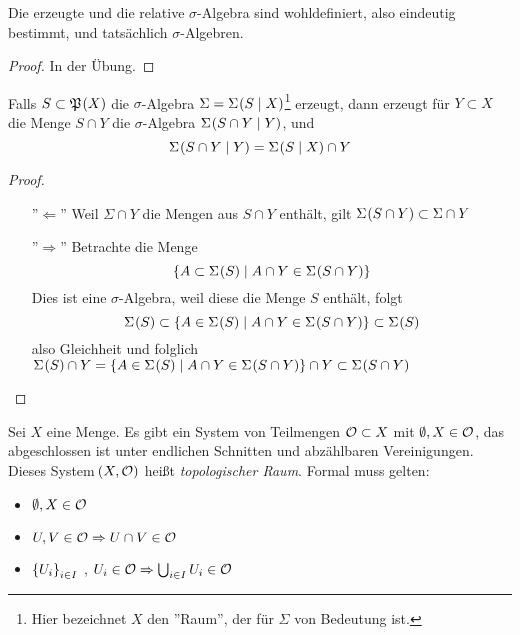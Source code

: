 \documentclass[skript.tex]{subfiles}
\begin{document}
	\begin{lem}
		Die erzeugte und die relative $\sigma$-Algebra sind wohldefiniert, also eindeutig bestimmt, und tatsächlich $\sigma$-Algebren.
	\end{lem}
	\begin{proof}
		In der Übung.
	\end{proof}

	\begin{beh*}
		Falls $S\subset \mf{P}\pr{X}$ die $\sigma$-Algebra $\Sigma = \Sigma\pr{S\mid X}$\footnote{Hier bezeichnet $X$ den ''Raum'', der für $\Sigma$ von Bedeutung ist. } erzeugt, dann erzeugt für $Y \subset X$ die Menge $S \cap Y$ die $\sigma$-Algebra $\Sigma\pr{S\cap Y\mid Y}$, und
		\begin{equation*}
			\Sigma\pr{S\cap Y \mid Y} = \Sigma\pr{S\mid X} \cap Y
		\end{equation*}
	\end{beh*}
	\begin{proof}\hfill 
		\begin{itemize}
			\item[''$\Leftarrow$''] Weil $\Sigma \cap Y$ die Mengen aus $S \cap Y$ enthält, gilt $\Sigma\pr{S\cap Y} \subset \Sigma \cap Y$ 
			\item[''$\Rightarrow$''] Betrachte die Menge
				\begin{equation*}
					\cbr{A \subset \Sigma\pr{S} \mid A \cap Y \in \Sigma\pr{S\cap Y}}
				\end{equation*}
				Dies ist eine $\sigma$-Algebra, weil diese die Menge $S$ enthält, folgt
				\begin{equation*}
					\Sigma\pr{S} \subset \cbr{A \in \Sigma\pr{S} \mid A \cap Y \in \Sigma\pr{S\cap Y}} \subset \Sigma\pr{S}
				\end{equation*}
				also Gleichheit und folglich $\Sigma\pr{S} \cap Y = \cbr{A \in \Sigma\pr{S} \mid A \cap Y \in \Sigma\pr{S \cap Y}} \cap Y \subset \Sigma\pr{S \cap Y}$
		\end{itemize}
	\end{proof}
	
	\begin{defin}
		Sei $X$ eine Menge. Es gibt ein System von Teilmengen $\mathcal{O} \subset X$ mit $\emptyset,X \in \mathcal{O}$, das abgeschlossen ist unter endlichen Schnitten und abzählbaren Vereinigungen. Dieses System $\pr{X,\mc{O}}$ heißt \textit{topologischer Raum}. Formal muss gelten:
		\begin{itemize}
			\item $\emptyset, X \in \mathcal{O}$
			\item $U,V \in \mathcal{O} \Rightarrow U\cap V \in \mathcal{O}$
			\item $\left\{U_i\right\}_{i\in I}$ , $U_i \in \mathcal{O} \Rightarrow \bigcup_{i\in I} U_i \in \mathcal{O}$
		\end{itemize}
	\end{defin}
	
\end{document}
